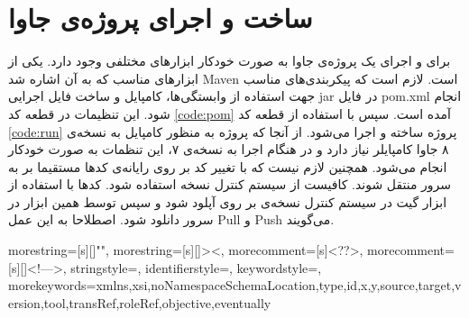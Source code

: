 \section{ساخت و اجرای پروژه‌ی جاوا}
برای  و اجرای یک پروژه‌ی جاوا به صورت خودکار ابزارهای مختلفی وجود دارد. یکی از ابزارهای مناسب که به آن اشاره شد Maven است. لازم است که پیکربندی‌های مناسب جهت استفاده از وابستگی‌ها، کامپایل و ساخت فایل اجرایی jar  در فایل pom.xml انجام شود. این تنظیمات در قطعه کد \ref{code:pom} آمده است. سپس با استفاده از قطعه کد \ref{code:run} پروژه ساخته و اجرا می‌شود. از آنجا که پروژه به منظور کامپایل به نسخه‌ی ۸ جاوا کامپایلر نیاز دارد و در هنگام اجرا به نسخه‌ی ۷، این تنظمات به صورت خودکار انجام می‌شود. همچنین لازم نیست که با تغییر کد بر روی رایانه‌ی   کدها مستقیما بر به سرور منتقل شوند. کافیست از سیستم کنترل نسخه استفاده شود. کدها  با استفاده از ابزار گیت در سیستم کنترل نسخه‌ی بر روی  آپلود شود و سپس توسط همین ابزار در سرور دانلود شود. اصطلاحا به این عمل Pull و Push می‌گویند.

{
	morestring=[s][\color{mauve}]{"}{"},
	morestring=[s][\color{black}]{>}{<},
	morecomment=[s]{<?}{?>},
	morecomment=[s][\color{dkgreen}]{<!--}{-->},
	stringstyle=\color{black},
	identifierstyle=\color{lightblue},
	keywordstyle=\color{red},
	morekeywords={xmlns,xsi,noNamespaceSchemaLocation,type,id,x,y,source,target,version,tool,transRef,roleRef,objective,eventually}%
}

